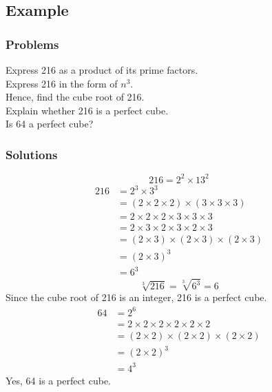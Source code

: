 \documentclass[a4paper,12pt]{article}
\begin{document}
\subsection{Example}
\subsubsection{Problems}
Express 216 as a product of its prime factors.\\
Express 216 in the form of \(n^3\).\\
Hence, find the cube root of 216.\\
Explain whether 216 is a perfect cube.\\
Is 64 a perfect cube?
\subsubsection{Solutions}
\[216=\boxed{2^2\times13^2}\]
\[\begin{aligned}
    216&=2^3\times3^3\\
    &=(2\times2\times2)\times(3\times3\times3)\\
    &=2\times2\times2\times3\times3\times3\\
    &=2\times3\times2\times3\times2\times3\\
    &=(2\times3)\times(2\times3)\times(2\times3)\\
    &=(2\times3)^3\\
    &=\boxed{6^3}
\end{aligned}\]
\[\sqrt[3]{216}=\sqrt[3]{6^3}=\boxed{6}\]
Since the cube root of 216 is an integer, 216 is a perfect cube.
\[\begin{aligned}
    64&=2^6\\
    &=2\times2\times2\times2\times2\times2\\
    &=(2\times2)\times(2\times2)\times(2\times2)\\
    &=(2\times2)^3\\
    &=4^3
\end{aligned}\]
Yes, 64 is a perfect cube. 
\end{document}
